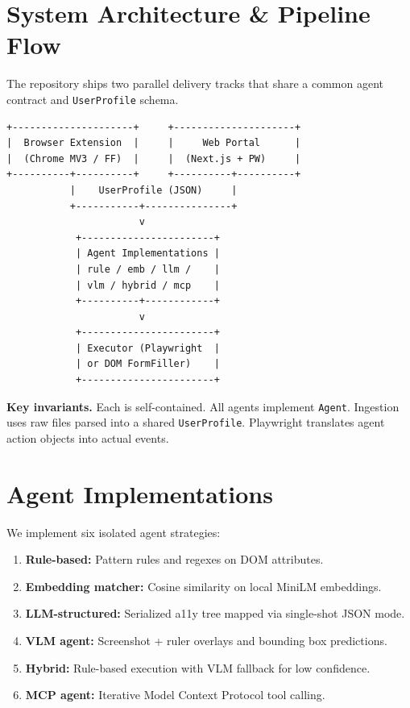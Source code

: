 \documentclass[conference]{IEEEtran}
\begin{document}
\section{System Architecture \& Pipeline Flow}
The repository ships two parallel delivery tracks that share a common
agent contract and \texttt{UserProfile} schema.

\begin{lstlisting}
+---------------------+     +---------------------+
|  Browser Extension  |     |     Web Portal      |
|  (Chrome MV3 / FF)  |     |  (Next.js + PW)     |
+----------+----------+     +----------+----------+
           |    UserProfile (JSON)     |
           +-----------+---------------+
                       v
            +-----------------------+
            | Agent Implementations |
            | rule / emb / llm /    |
            | vlm / hybrid / mcp    |
            +----------+------------+
                       v
            +-----------------------+
            | Executor (Playwright  |
            | or DOM FormFiller)    |
            +-----------------------+
\end{lstlisting}

\textbf{Key invariants.} Each  is self-contained. All agents implement \texttt{Agent}. Ingestion uses raw files parsed into a shared \texttt{UserProfile}. Playwright translates agent action objects into actual events.

\section{Agent Implementations}
We implement six isolated agent strategies:
\begin{enumerate}
  \item \textbf{Rule-based:} Pattern rules and regexes on DOM attributes.
  \item \textbf{Embedding matcher:} Cosine similarity on local MiniLM embeddings.
  \item \textbf{LLM-structured:} Serialized a11y tree mapped via single-shot JSON mode.
  \item \textbf{VLM agent:} Screenshot + ruler overlays and bounding box predictions.
  \item \textbf{Hybrid:} Rule-based execution with VLM fallback for low confidence.
  \item \textbf{MCP agent:} Iterative Model Context Protocol tool calling.
\end{enumerate}
\end{document}
